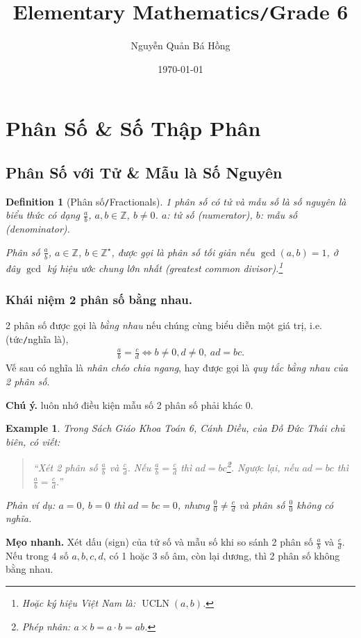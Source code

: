 \documentclass{article}
\title{Elementary Mathematics\texttt{/}Grade 6}
\author{Nguyễn Quản Bá Hồng}
\date{\today}
\numberwithin{equation}{section}
\newtheorem{definition}{Definition}[section]
\newtheorem{example}{Example}[section]
\begin{document}
\maketitle
\begin{abstract}
	
\end{abstract}
\tableofcontents


\section{Phân Số \& Số Thập Phân}

\subsection{Phân Số với Tử \& Mẫu là Số Nguyên}
\begin{definition}[Phân số\texttt{/}Fractionals]
	1 \emph{phân số} có tử và mẫu số là số nguyên là biểu thức có dạng $\frac{a}{b}$, $a,b\in\mathbb{Z}$, $b\ne 0$. $a$: tử số (numerator), $b$: mẫu số (denominator).
	
	Phân số $\frac{a}{b}$, $a\in\mathbb{Z}$, $b\in\mathbb{Z}^\star$, được gọi là \emph{phân số tối giản} nếu $\operatorname{gcd}(a,b) = 1$, ở đây $\operatorname{gcd}$ ký hiệu \emph{ước chung lớn nhất} (greatest common divisor).\footnote{Hoặc ký hiệu Việt Nam là: $\operatorname{UCLN}(a,b)$.}
\end{definition}

\subsubsection{Khái niệm 2 phân số bằng nhau.} 2 phân số được gọi là \textit{bằng nhau} nếu chúng cùng biểu diễn một giá trị, i.e. (tức\texttt{/}nghĩa là),
\begin{align}
	\boxed{\frac{a}{b} = \frac{c}{d}\Leftrightarrow b\ne 0, d\ne 0,\ ad = bc.}
\end{align}
Vế sau có nghĩa là \textit{nhân chéo chia ngang}, hay được gọi là \textit{quy tắc bằng nhau của 2 phân số}.

\textbf{Chú ý.} luôn nhớ điều kiện mẫu số 2 phân số phải khác 0.

\begin{example}
	Trong Sách Giáo Khoa Toán 6, Cánh Diều, của Đỗ Đức Thái chủ biên, có viết:
	\begin{quotation}
		``Xét 2 phân số $\frac{a}{b}$ và $\frac{c}{d}$. Nếu $\frac{a}{b} = \frac{c}{d}$ thì $ad = bc$\footnote{Phép nhân: $a\times b = a\cdot b = ab$.}. Ngược lại, nếu $ad = bc$ thì $\frac{a}{b} = \frac{c}{d}$.''
	\end{quotation}
	Phản ví dụ: $a = 0$, $b = 0$ thì $ad = bc = 0$, nhưng $\frac{0}{0}\ne\frac{c}{d}$ và phân số $\frac{0}{0}$ không có nghĩa.
\end{example}
\textbf{Mẹo nhanh.} Xét dấu (sign) của tử số và mẫu số khi so sánh 2 phân số $\frac{a}{b}$ và $\frac{c}{d}$. Nếu trong 4 số $a,b,c,d$, có 1 hoặc 3 số âm, còn lại dương, thì 2 phân số không bằng nhau.
\end{document}
